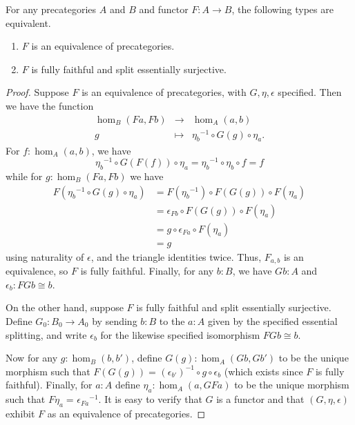 \documentclass{amsart}
\newcommand{\id}[3][]{\ensuremath{#2 =_{#1} #3}\xspace}
\theoremstyle{definition}
\theoremstyle{remark}
\numberwithin{equation}{section}
\newcommand{\inv}[1]{{#1}^{-1}}
\begin{document}
\begin{lem}\label{ct:ffeso}
  For any precategories $A$ and $B$ and functor $F:A\to B$, the following types are equivalent.
  \begin{enumerate}
  \item $F$ is an equivalence of precategories.\label{item:ct:ffeso1}
  \item $F$ is fully faithful and split essentially surjective.\label{item:ct:ffeso2}
  \end{enumerate}
\end{lem}
\begin{proof}
  Suppose $F$ is an equivalence of precategories, with $G,\eta,\epsilon$ specified.
  Then we have the function
  \begin{equation*}
    \begin{array}{rcl}
      \hom_B(Fa,Fb) &\to& \hom_A(a,b)\\
      g &\mapsto& \inv{\eta_b}\circ G(g)\circ \eta_a.
    \end{array}
  \end{equation*}
  For $f:\hom_A(a,b)$, we have
  \[ \inv{\eta_{b}}\circ G(F(f))\circ \eta_{a}  =
  \inv{\eta_{b}} \circ \eta_{b} \circ f=
  f
  \]
  while for $g:\hom_B(Fa,Fb)$ we have
  \begin{align*}
    F(\inv{\eta_b} \circ G(g)\circ\eta_a)
    &= F(\inv{\eta_b})\circ F(G(g))\circ F(\eta_a)\\
    &= \epsilon_{Fb}\circ F(G(g))\circ F(\eta_a)\\
    &= g\circ\epsilon_{Fa}\circ F(\eta_a)\\
    &= g
  \end{align*}
  using naturality of $\epsilon$, and the triangle identities twice.
  Thus, $F_{a,b}$ is an equivalence, so $F$ is fully faithful.
  Finally, for any $b:B$, we have $Gb:A$ and $\epsilon_b:FGb\cong b$.

  On the other hand, suppose $F$ is fully faithful and split essentially surjective.
  Define $G_0:B_0\to A_0$ by sending $b:B$ to the $a:A$ given by the specified essential splitting, and write $\epsilon_b$ for the likewise specified isomorphism $FGb\cong b$.

  Now for any $g:\hom_B(b,b')$, define $G(g):\hom_A(Gb,Gb')$ to be the unique morphism such that $\id{F(G(g))}{\inv{(\epsilon_{b'})}\circ g \circ \epsilon_b }$ (which exists since $F$ is fully faithful).
  Finally, for $a:A$ define $\eta_a:\hom_A(a,GFa)$ to be the unique morphism such that $\id{F\eta_a}{\inv{\epsilon_{Fa}}}$.
  It is easy to verify that $G$ is a functor and that $(G,\eta,\epsilon)$ exhibit $F$ as an equivalence of precategories.


\end{proof}
\end{document}
